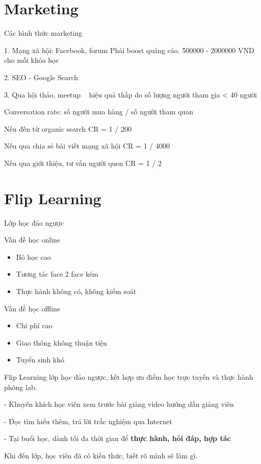 \section{Marketing}

Các hình thức marketing

1. Mạng xã hội: Facebook, forum
Phải boost quảng cáo. 500000 - 2000000 VND cho mỗi khóa học

2. SEO - Google Search

3. Qua hội thảo, meetup ~ hiệu quả thấp do số lượng người tham gia < 40 người

Conversation rate: số người mua hàng / số người tham quan

Nếu đến từ organic search CR = 1 / 200

Nếu qua chia sẻ bài viết mạng xã hội CR = 1 / 4000

Nếu qua giới thiệu, tư vấn người quen CR = 1 / 2

\section{Flip Learning}

Lớp học đảo ngược

Vấn đề học online

\begin{itemize}
  \item Bỏ học cao
  \item Tương tác face 2 face kém
  \item Thực hành không có, không kiểm soát
\end{itemize}

Vấn đề học offline

\begin{itemize}
  \item Chi phí cao
  \item Giao thông không thuận tiện
  \item Tuyển sinh khó
\end{itemize}

Flip Learning lớp học đảo ngược, kết hợp ưu điểm học trực tuyến và thực hành phòng lab.

- Khuyến khích học viên xem trước bài giảng video hướng dẫn giảng viên

- Đọc tìm hiểu thêm, trả lời trắc nghiệm qua Internet

- Tại buổi học, dành tối đa thời gian để \textbf{thực hành, hỏi đáp, hợp tác}

Khi đến lớp, học viên đã có kiến thức, biết rõ mình sẽ làm gì.

